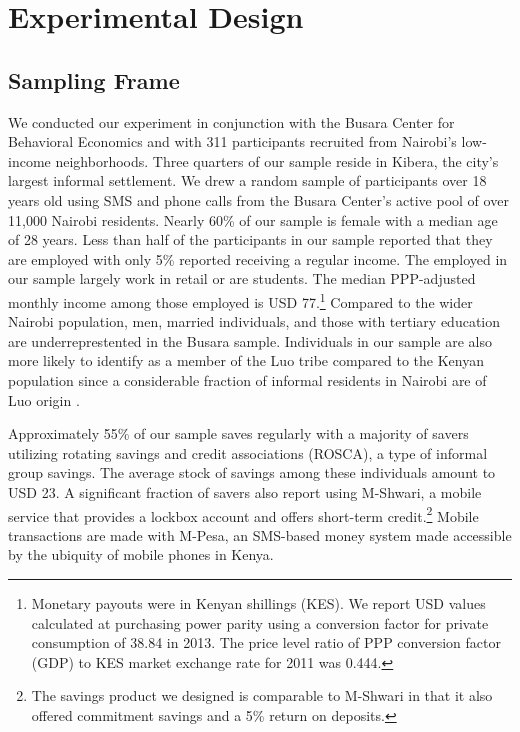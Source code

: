 \documentclass[12pt]{article}
\begin{document}
\section{Experimental Design} \label{sec:design}

	\subsection{Sampling Frame}

		We conducted our experiment in conjunction with the Busara Center for Behavioral Economics and with 311 participants recruited from Nairobi's low-income neighborhoods. Three quarters of our sample reside in Kibera, the city's largest informal settlement. We drew a random sample of participants over 18 years old using SMS and phone calls from the Busara Center's active pool of over 11,000 Nairobi residents. Nearly 60\% of our sample is female with a median age of 28 years. Less than half of the participants in our sample reported that they are employed with only 5\% reported receiving a regular income. The employed in our sample largely work in retail or are students. The median PPP-adjusted monthly income among those employed is USD 77.\footnote{Monetary payouts were in Kenyan shillings (KES). We report USD values calculated at purchasing power parity using a conversion factor for private consumption of 38.84 in 2013. The price level ratio of PPP conversion factor (GDP) to KES market exchange rate for 2011 was 0.444.} Compared to the wider Nairobi population, men, married individuals, and those with tertiary education are underreprestented in the Busara sample. Individuals in our sample are also more likely to identify as a member of the Luo tribe compared to the Kenyan population since a considerable fraction of informal residents in Nairobi are of Luo origin \parencite{haushofer_methodology_2014}.

		Approximately 55\% of our sample saves regularly with a majority of savers utilizing rotating savings and credit associations (ROSCA), a type of informal group savings. The average stock of savings among these individuals amount to USD 23. A significant fraction of savers also report using M-Shwari, a mobile service that provides a lockbox account and offers short-term credit.\footnote{The savings product we designed is comparable to M-Shwari in that it also offered commitment savings and a 5\% return on deposits.} Mobile transactions are made with M-Pesa, an SMS-based money system made accessible by the ubiquity of mobile phones in Kenya.
\end{document}
